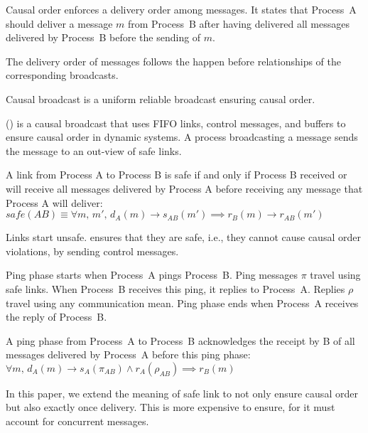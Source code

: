Causal order enforces a delivery order among messages. It states that Process~A
should deliver a message $m$ from Process~B after having delivered all messages
delivered by Process~B before the sending of $m$.

\begin{definition}
  The delivery order of messages follows the happen before relationships of the
  corresponding broadcasts.
\end{definition}

\begin{definition}
  Causal broadcast is a uniform reliable broadcast ensuring causal order.
\end{definition}

\PCBROADCAST (\REF) is a causal broadcast that uses FIFO links, control
messages, and buffers to ensure causal order in dynamic systems. A process
broadcasting a message sends the message to an out-view of safe links.

\begin{definition} 
  A link from Process A to Process B is safe if and only if Process B received
  or will receive all messages delivered by Process A before receiving any
  message that Process A will
  deliver: $safe(AB) \equiv \forall m,\, m',\, d_A(m) \rightarrow s_{AB}(m')
  \implies r_B(m) \rightarrow r_{AB}(m')$
\end{definition}

Links start unsafe. \PCBROADCAST ensures that they are safe, i.e., they cannot
cause causal order violations, by sending control messages.

\begin{definition}
  Ping phase starts when Process~A pings Process~B. Ping messages $\pi$ travel
  using safe links. When Process~B receives this ping, it replies to
  Process~A. Replies $\rho$ travel using any communication mean. Ping phase ends
  when Process~A receives the reply of Process~B.
\end{definition}

\begin{lemma}
  A ping phase from Process~A to Process~B acknowledges the receipt by B of all
  messages delivered by Process~A before this ping phase:
  $\forall m,\, d_A(m) \rightarrow s_A(\pi_{AB}) \wedge r_A(\rho_{AB}) \implies
  r_B(m)$
\end{lemma}

In this paper, we extend the meaning of safe link to not only ensure causal
order but also exactly once delivery. This is more expensive to ensure, for it
must account for concurrent messages. 

